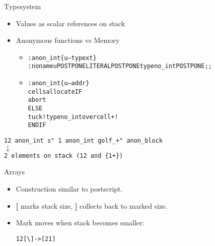 \documentclass{beamer}
\begin{document}
\begin{frame}
    Typesystem
    \begin{itemize}
        \item Values as scalar references on stack
        \item Anonymous functions vs Memory
          \begin{itemize}
          \item
            \begin{alltt}
              \scriptsize
              : anon\_int \{ u -- typext \} \\
              \quad:noname  u POSTPONE LITERAL POSTPONE typeno\_int  POSTPONE ; ;
            \end{alltt}
          \item
            \begin{alltt}
              \scriptsize
              : anon\_int \{ u -- addr \}\\
               cells allocate IF\\
              \qquad abort\\
              \quad ELSE\\
              \qquad tuck ! typeno\_int over cell+ !\\
              \quad ENDIF\\
            \end{alltt}
          \end{itemize}
    \end{itemize}



    \begin{center}
        \texttt{12 anon\_int s" 1 anon\_int golf\_+" anon\_block} \\
        $\downarrow$ \\
        \texttt{2 elements on stack (12 and \{1+\})}
    \end{center}

\end{frame}

\begin{frame}
    Arrays

    \begin{itemize}
        \item Construction similar to postscript.
        \item \textbf{[} marks stack size, \textbf{]} collects back to marked size.
        \item Mark moves when stack becomes smaller:\\
          \begin{alltt}
            1 2 [\textbackslash] -> [2 1]
          \end{alltt}

    \end{itemize}
\end{frame}
\end{document}
